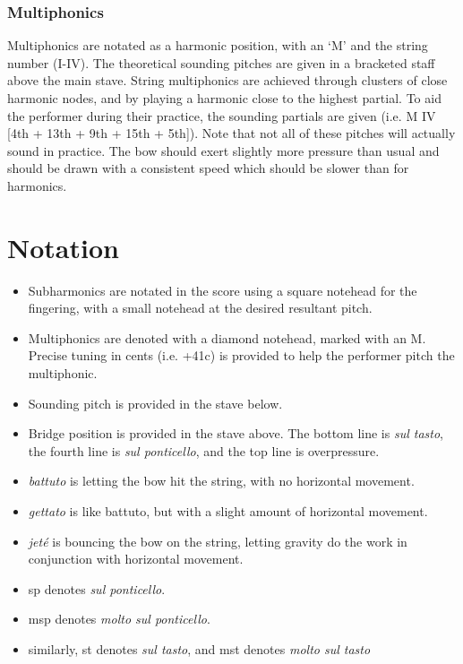 \subsubsection*{Multiphonics}
Multiphonics are notated as a harmonic position, with an `M' and the string number (I-IV). 
The theoretical sounding pitches are given in a bracketed staff above the main stave.
String multiphonics are achieved through clusters of close harmonic nodes, and by playing a harmonic close to the highest partial.
To aid the performer during their practice, the sounding partials are given (i.e. M IV [4th + 13th + 9th + 15th + 5th]).
Note that not all of these pitches will actually sound in practice.
The bow should exert slightly more pressure than usual and should be drawn with a consistent speed which should be slower than for harmonics.

\section*{Notation}
\begin{itemize}

    \item Subharmonics are notated in the score using a square notehead for the fingering, with a small notehead at the desired resultant pitch.
    \item Multiphonics are denoted with a diamond notehead, marked with an M. Precise tuning in cents (i.e. +41c) is provided to help the performer pitch the multiphonic.
    \item Sounding pitch is provided in the stave below.
    \item Bridge position is provided in the stave above. The bottom line is \emph{sul tasto}, the fourth line is \emph{sul ponticello}, and the top line is overpressure.
    \item \emph{battuto} is letting the bow hit the string, with no horizontal movement.
    \item \emph{gettato} is like battuto, but with a slight amount of horizontal movement.
    \item \emph{jeté} is bouncing the bow on the string, letting gravity do the work in conjunction with horizontal movement.
    \item sp denotes \emph{sul ponticello}.
    \item msp denotes \emph{molto sul ponticello}.
    \item similarly, st denotes \emph{sul tasto}, and mst denotes \emph{molto sul tasto}
\end{itemize}

\newpage\label{app:The Veldt Score}

% 

